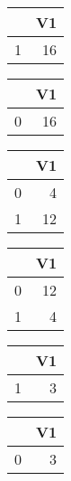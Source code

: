 \bigskip\bigskip
\centering
\begin{tabular}{rr}
  \hline
 & V1 \\ 
  \hline
1 &  16 \\ 
   \hline
\end{tabular}

\bigskip\bigskip
\centering
\begin{tabular}{rr}
  \hline
 & V1 \\ 
  \hline
0 &  16 \\ 
   \hline
\end{tabular}

\bigskip\bigskip
\centering
\begin{tabular}{rr}
  \hline
 & V1 \\ 
  \hline
0 &   4 \\ 
  1 &  12 \\ 
   \hline
\end{tabular}

\bigskip\bigskip
\centering
\begin{tabular}{rr}
  \hline
 & V1 \\ 
  \hline
0 &  12 \\ 
  1 &   4 \\ 
   \hline
\end{tabular}

\bigskip\bigskip
\centering
\begin{tabular}{rr}
  \hline
 & V1 \\ 
  \hline
1 &   3 \\ 
   \hline
\end{tabular}

\bigskip\bigskip
\centering
\begin{tabular}{rr}
  \hline
 & V1 \\ 
  \hline
0 &   3 \\ 
   \hline
\end{tabular}

